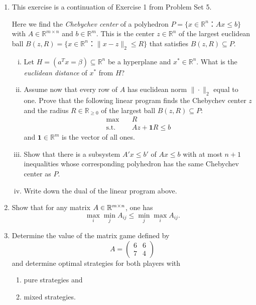 \documentclass[11pt]{article}
\institute{\'Ecole Polytechnique F\'ed\'erale de Lausanne}
\renewcommand{\leq}{\leqslant}
\begin{document}
\makeheader

\begin{enumerate}[1)]

\item This exercise is a continuation of Exercise 1 from Problem Set 5.  

Here we find  the \emph{Chebychev center} of a polyhedron $P = \{x ∈ ℝ^n ：Ax ≤ b\}$ with $A ∈ ℝ^{m ×n}$ and $b ∈ ℝ^m$. This is the center $z ∈ ℝ^n$  of the largest euclidean ball $B(z,R) = \{ x ∈ ℝ^n ： \| x - z \|_2 ≤ R\}$ that satisfies $B(z,R) ⊆ P$.
  \begin{enumerate}[i)]
  \item Let $H = (a^T x = β) ⊆  ℝ^n$ be a hyperplane and $x^*∈ ℝ^n$. What is the \emph{euclidean distance} of $x^*$ from $H$?
  \item
    Assume now that every row of $A$ has euclidean norm $\|⋅\|_2$ equal to one.  
    Prove that the following linear program finds the Chebychev center $z$ and the radius $R ∈ ℝ_{≥0}$  of the largest ball $B(z,R) ⊆ P$:
      \begin{align*}
        \max & \quad R \\
        \text{s.t.} & \quad A z +  \mathbf{1} R ≤ b
      \end{align*}
   and $\mathbf{1}∈ ℝ^m$ is the vector of all ones.
  \item Show that there is a subsystem $A'x ≤ b'$ of $Ax≤b$ with at most $n+1$ inequalities whose corresponding polyhedron has the same Chebychev center as $P$.
  \item Write down the dual of the linear program above. 
  \end{enumerate}

\item Show that for any matrix $A \in \mathbb{R}^{m\times n}$, one has
  \begin{displaymath}
    \max_{i}\min_{j} A_{ij} \leq \min_{j}\max_{i} A_{ij}.
  \end{displaymath}

\item Determine the value of the matrix game defined by 
  \begin{displaymath}
    A =
    \begin{pmatrix}
      6 & 6 \\
      7 & 4
    \end{pmatrix}
  \end{displaymath}
and determine optimal strategies for both players with
\begin{enumerate}
\item pure strategies and 
\item mixed strategies.
\end{enumerate} 


\end{enumerate}
\end{document}

